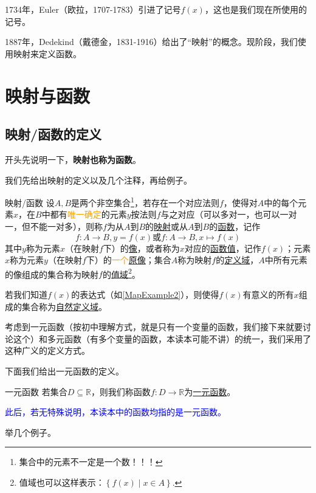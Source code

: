 \documentclass[lang=cn,math=cm,chinesefont=nofont,11pt,scheme=chinese,twocol]{elegantbook}
\begin{document}
1734年，Euler（欧拉，1707-1783）引进了记号$f(x)$，这也是我们现在所使用的记号。

1887年，Dedekind（戴德金，1831-1916）给出了“映射”的概念。现阶段，我们使用映射来定义函数。

\section{映射与函数}

\subsection{映射/函数的定义}

开头先说明一下，\textbf{映射也称为函数}。

我们先给出映射的定义以及几个注释，再给例子。

\begin{definition}{映射/函数}
  设$A,B$是两个非空集合\footnote{集合中的元素不一定是一个数！！！}，若存在一个对应法则$f$，使得对$A$中的每个元素$x$，在$B$中都有\textcolor{orange}{唯一确定}的元素$y$按法则$f$与之对应（可以多对一，也可以一对一，但不能一对多），则称$f$为从$A$到$B$的\underline{映射}或从$A$到$B$的\underline{函数}，记作$$f:A\rightarrow B,y=f(x)\text{或}f:A\rightarrow B,x\mapsto f(x)$$其中$y$称为元素$x$（在映射$f$下）的\underline{像}，或者称为$x$对应的\underline{函数值}，记作$f(x)$；元素$x$称为元素$y$（在映射$f$下）的\textcolor{orange}{一个}\underline{原像}；集合$A$称为映射$f$的\underline{定义域}，$A$中所有元素的像组成的集合称为映射$f$的\underline{值域}\footnote{值域也可以这样表示：$\left\{f(x)\mid x\in A\right\}.$}。

  若我们知道$f(x)$的表达式（如\ref{MapExample2}），则使得$f(x)$有意义的所有$x$组成的集合称为\underline{自然定义域}。
\end{definition}

考虑到一元函数（按初中理解方式，就是只有一个变量的函数，我们接下来就要讨论这个）和多元函数（有多个变量的函数，本读本可能不讲）的统一，我们采用了这种广义的定义方式。



下面我们给出一元函数的定义。

\begin{definition}{一元函数}
  若集合$D\subseteq \mathbb{R}$，则我们称函数$f:D\rightarrow\mathbb{R}$为\underline{一元函数}。
\end{definition}

\textcolor{blue}{此后，若无特殊说明，本读本中的函数均指的是一元函数。}

举几个例子。
\end{document}

